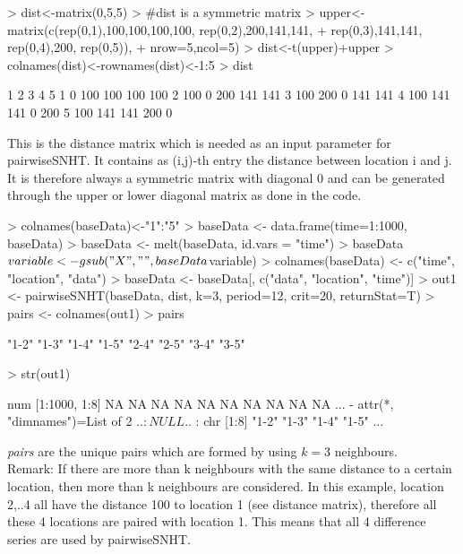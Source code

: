\documentclass[nojss]{jss}
\begin{document}
\begin{Schunk}
\begin{Sinput}
> dist<-matrix(0,5,5)
> #dist is a symmetric matrix
> upper<-matrix(c(rep(0,1),100,100,100,100, rep(0,2),200,141,141,
+               rep(0,3),141,141, rep(0,4),200, rep(0,5)), 
+               nrow=5,ncol=5)
> dist<-t(upper)+upper
> colnames(dist)<-rownames(dist)<-1:5
> dist
\end{Sinput}
\begin{Soutput}
    1   2   3   4   5
1   0 100 100 100 100
2 100   0 200 141 141
3 100 200   0 141 141
4 100 141 141   0 200
5 100 141 141 200   0
\end{Soutput}
\end{Schunk}

This is the distance matrix which is needed as an input parameter for pairwiseSNHT. It contains as (i,j)-th entry the distance between location i and j. It is therefore always a symmetric matrix with diagonal 0 and can be generated through the upper or lower diagonal matrix as done in the code.

\begin{Schunk}
\begin{Sinput}
> colnames(baseData)<-"1":"5"
> baseData <- data.frame(time=1:1000, baseData)
> baseData <- melt(baseData, id.vars = "time")
> baseData$variable <- gsub("X", "", baseData$variable)
> colnames(baseData) <- c("time", "location", "data")
> baseData <- baseData[, c("data", "location", "time")]
> out1 <- pairwiseSNHT(baseData, dist, k=3, period=12, crit=20, returnStat=T)
> pairs <- colnames(out1)
> pairs
\end{Sinput}
\begin{Soutput}
[1] "1-2" "1-3" "1-4" "1-5" "2-4" "2-5" "3-4" "3-5"
\end{Soutput}
\begin{Sinput}
> str(out1)
\end{Sinput}
\begin{Soutput}
 num [1:1000, 1:8] NA NA NA NA NA NA NA NA NA NA ...
 - attr(*, "dimnames")=List of 2
  ..$ : NULL
  ..$ : chr [1:8] "1-2" "1-3" "1-4" "1-5" ...
\end{Soutput}
\end{Schunk}

\textit{pairs} are the unique pairs which are formed by using $k=3$ neighbours.\\

Remark: If there are more than k neighbours with the same distance to a certain location, then more than k neighbours are considered. In this example, location 2,..4 all have the distance 100 to location 1 (see distance matrix), therefore all these 4 locations are paired with location 1. This means that all 4 difference series are used by pairwiseSNHT.\\
\end{document}
